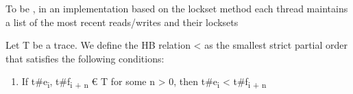 \documentclass[landscape, a4paper]{article}
\begin{document}
\begin{minipage}[t]{0.195\linewidth}
\begin{betterlist}
\begin{betterlist}
			\item To be , in an implementation based on the lockset method each thread maintains a list of the most recent reads/writes and their locksets
		\end{betterlist}
	\end{betterlist}
	\begin{betterlist}
		\item Let T be a trace. We define the HB relation < as the smallest strict partial order that satisfies the following conditions:
		\begin{enumerate}
			\item {} If t\#e\textsubscript{i}, t\#f\textsubscript{i + n} € T for some n > 0, then t\#e\textsubscript{i} < t\#f\textsubscript{i + n}
		\end{enumerate}
	\end{betterlist}

\end{minipage}
\end{document}
